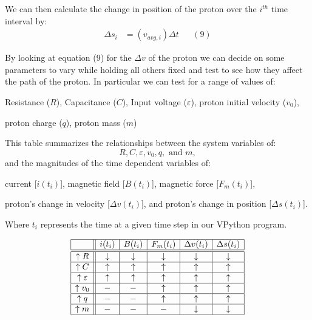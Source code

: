 \documentclass[11pt]{article}
\begin{document}
\noindent We can then calculate the change in position of the proton over the $i^{th}$ time interval by:
\begin{align*}
\Delta s_i&=\left(v_{avg,i}\right)\Delta t&&(9)
\end{align*}

\vspace{.2in}

\noindent By looking at equation (9) for the $\Delta v$ of the proton we can decide on some parameters to vary while holding all others fixed and test to see how they affect the path of the proton. In particular we can test for a range of values of:
\begin{center}
Resistance ($R$), Capacitance ($C$), Input voltage ($\varepsilon$), proton initial velocity ($v_0$), 

proton charge ($q$), proton mass ($m$)
\end{center}

\newpage

\noindent This table summarizes the relationships between the system variables of:
\[
R,C,\varepsilon,v_0,q,\text{ and }m,
\]
\noindent and the magnitudes of the time dependent variables of: 
\begin{center}
current [$i(t_i)$], magnetic field [$B(t_i)$], magnetic force [$F_m(t_i)$], 

proton's change in velocity [$\Delta v(t_i)$], and proton's change in position [$\Delta s(t_i)$]. 
\end{center}

\noindent Where $t_i$ represents the time at a given time step in our VPython program.
\vspace{.3in}

\[
\begin{array}{|c||c|c|c|c|c|}
 \hline
 & i(t_i) & B(t_i) & F_m(t_i) & \Delta v(t_i) & \Delta s(t_i) \\ 
 \hline\hline
 \uparrow R & \downarrow & \downarrow & \downarrow & \downarrow & \downarrow \\
 \hline
 \uparrow C & \uparrow & \uparrow & \uparrow & \uparrow & \uparrow \\
 \hline
 \uparrow \varepsilon & \uparrow & \uparrow & \uparrow & \uparrow & \uparrow \\
 \hline
 \uparrow v_0 &- & - & \uparrow & \uparrow & \uparrow \\
 \hline
 \uparrow q &- & - & \uparrow & \uparrow & \uparrow \\
 \hline
 \uparrow m  &- & - & - & \downarrow & \downarrow \\
 \hline
\end{array}
\]
\vspace{.4in}
\end{document}
